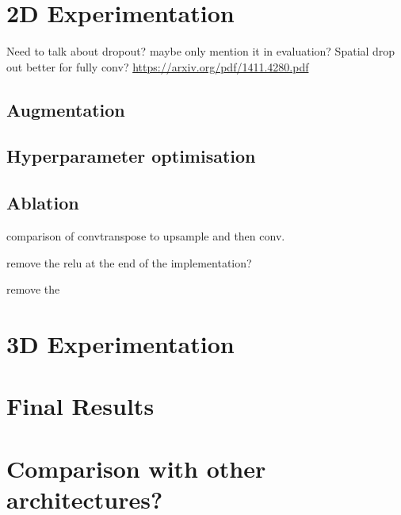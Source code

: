 \section{2D Experimentation}

Need to talk about dropout? maybe only mention it in evaluation?
Spatial drop out better for fully conv? \url{https://arxiv.org/pdf/1411.4280.pdf}


\subsection{Augmentation}
\label{sec:evalaugmentation}

\subsection{Hyperparameter optimisation}

\subsection{Ablation}

comparison of convtranspose to upsample and then conv.

remove the relu at the end of the implementation?

remove the 

\section{3D Experimentation}

\section{Final Results}

\section{Comparison with other architectures?}

